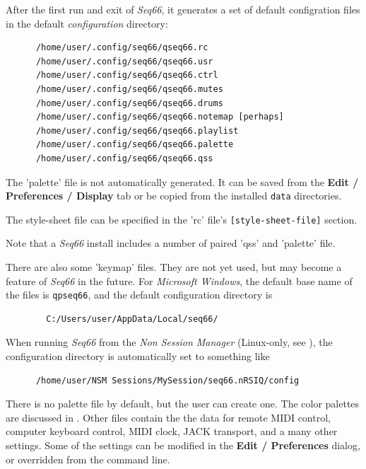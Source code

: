    After the first run and exit of \textsl{Seq66},
   it generates a set of default configration files in the default
   \textsl{configuration} directory:

   \begin{verbatim}
      /home/user/.config/seq66/qseq66.rc
      /home/user/.config/seq66/qseq66.usr
      /home/user/.config/seq66/qseq66.ctrl
      /home/user/.config/seq66/qseq66.mutes
      /home/user/.config/seq66/qseq66.drums
      /home/user/.config/seq66/qseq66.notemap [perhaps]
      /home/user/.config/seq66/qseq66.playlist
      /home/user/.config/seq66/qseq66.palette
      /home/user/.config/seq66/qseq66.qss
   \end{verbatim}

   The 'palette' file is not automatically generated.
   It can be saved from the
   \textbf{Edit / Preferences / Display} tab or be copied from the installed
   \texttt{data} directories.

   The style-sheet file can be specified in the 'rc' file's
   \texttt{[style-sheet-file]} section.

   Note that a \textsl{Seq66} install includes a number of paired 'qss'
   and 'palette' file.

   There are also some 'keymap' files.
   They are not yet used, but may become a
   feature of \textsl{Seq66} in the future.
   For \textsl{Microsoft Windows}, the default base name of the files is
   \texttt{qpseq66}, and the default configuration directory is

   \begin{verbatim}
        C:/Users/user/AppData/Local/seq66/
   \end{verbatim}

   When running \textsl{Seq66} from the \textsl{Non Session Manager}
   (Linux-only, see ),
   the configuration directory is automatically set to something like

   \begin{verbatim}
      /home/user/NSM Sessions/MySession/seq66.nRSIQ/config
   \end{verbatim}

   There is no palette file by default, but the user can create one.
   The color palettes are discussed in .
   Other files contain the the data for remote MIDI control, computer keyboard
   control, MIDI clock, JACK transport, and a many other settings.
   Some of the settings can be modified in the \textbf{Edit / Preferences}
   dialog, or overridden from the command line.

